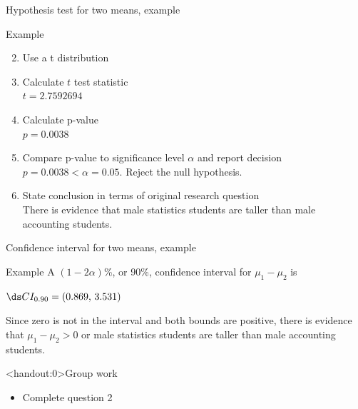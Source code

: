 \documentclass[xcolor=table, handout]{beamer}
\begin{document}
\begin{frame}{Hypothesis test for two means, example}
\begin{exampleblock}{Example}
\large
\begin{enumerate}
\setcounter{enumi}{1}

\item Use a t distribution
\pause\item Calculate $t$ test statistic\\
\pause$t=2.7592694$
\pause\item Calculate p-value\\
\pause$p = 0.0038$
\pause\item Compare p-value to significance level $\alpha$ and report decision\\
\pause$p = 0.0038 < \alpha = 0.05$. Reject the null hypothesis.
\pause\item State conclusion in terms of original research question\\
\pause There is evidence that male statistics students are taller than male accounting students.
\end{enumerate}

\end{exampleblock}
\end{frame}

\begin{frame}{Confidence interval for two means, example}
\begin{exampleblock}{Example}
\large
A $(1-2\alpha)$\%, or 90\%, confidence interval for $\mu_1 - \mu_2$ is\\
\pause\medskip
{\centering $\ds CI_{0.90} = (0.869, \, 3.531)$ \par}
\medskip

\pause Since zero is not in the interval and both bounds are positive, there is evidence that $\mu_1 - \mu_2 > 0$ or male statistics students are taller than male accounting students.

\end{exampleblock}
\end{frame}

\begin{frame}<handout:0>{Group work}
\begin{block}{}
\large
\begin{itemize}
\item Complete question 2
\end{itemize}
\end{block}
\end{frame}
\end{document}
